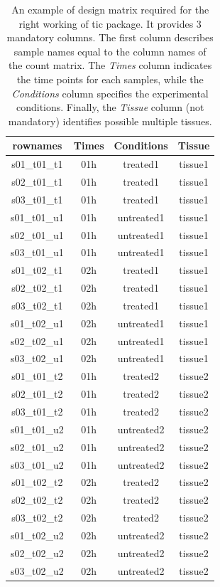\begin{table}[H]
\centering
\begin{tabular}{cccc}
\hline\hline
rownames & Times & Conditions & Tissue \\
\hline
s01\_t01\_t1 & 01h & treated1 & tissue1 \\
s02\_t01\_t1 & 01h & treated1 & tissue1 \\
s03\_t01\_t1 & 01h & treated1 & tissue1 \\
s01\_t01\_u1 & 01h & untreated1 & tissue1 \\
s02\_t01\_u1 & 01h & untreated1 & tissue1 \\
s03\_t01\_u1 & 01h & untreated1 & tissue1 \\
s01\_t02\_t1 & 02h & treated1 & tissue1 \\
s02\_t02\_t1 & 02h & treated1 & tissue1 \\
s03\_t02\_t1 & 02h & treated1 & tissue1 \\
s01\_t02\_u1 & 02h & untreated1 & tissue1 \\
s02\_t02\_u1 & 02h & untreated1 & tissue1 \\
s03\_t02\_u1 & 02h & untreated1 & tissue1 \\
s01\_t01\_t2 & 01h & treated2 & tissue2 \\
s02\_t01\_t2 & 01h & treated2 & tissue2 \\
s03\_t01\_t2 & 01h & treated2 & tissue2 \\
s01\_t01\_u2 & 01h & untreated2 & tissue2 \\
s02\_t01\_u2 & 01h & untreated2 & tissue2 \\
s03\_t01\_u2 & 01h & untreated2 & tissue2 \\
s01\_t02\_t2 & 02h & treated2 & tissue2 \\
s02\_t02\_t2 & 02h & treated2 & tissue2 \\
s03\_t02\_t2 & 02h & treated2 & tissue2 \\
s01\_t02\_u2 & 02h & untreated2 & tissue2 \\
s02\_t02\_u2 & 02h & untreated2 & tissue2 \\
s03\_t02\_u2 & 02h & untreated2 & tissue2 \\
\hline
\end{tabular}
\caption[\gls{tic} Design Matrix example]{An example of design matrix required for the right working of \gls{tic} package.
It provides 3 mandatory columns.
The first column describes sample names equal to the column names of the count matrix.
The \textit{Times} column indicates the time points for each samples, while the \textit{Conditions} column specifies the experimental conditions.
Finally, the \textit{Tissue} column (not mandatory) identifies possible multiple tissues.}
\label{tab:ticorserdesmat}
\end{table}

